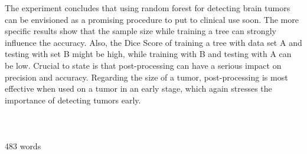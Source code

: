 \documentclass{article}
\begin{document}
 The experiment concludes that using random forest for detecting brain tumors can be envisioned as a promising procedure to put to clinical use soon. The more specific results show that the sample size while training a tree can strongly influence the accuracy. Also, the Dice Score of training a tree with data set A and testing with set B might be high, while training with B and testing with A can be low. Crucial to state is that post-processing can have a serious impact on precision and accuracy. Regarding the size of a tumor, post-processing is most effective when used on a tumor in an early stage, which again stresses the importance of detecting tumors early. \\
 \\
 \\
 \\
 483 words
\end{document}
